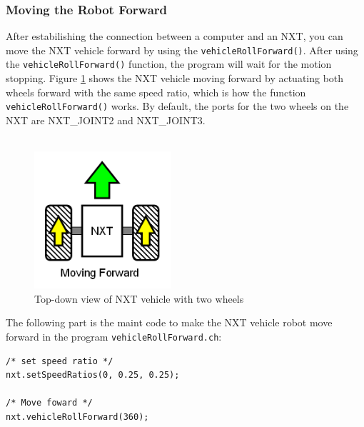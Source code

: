 \documentclass[11pt]{article}
\begin{document}
%

\subsubsection{Moving the Robot Forward}
After estabilishing the connection between a computer and an NXT, you can move the NXT 
vehicle forward by using the \verb+vehicleRollForward()+. After using the 
\verb+vehicleRollForward()+ function, the program will wait for the motion stopping. 
Figure \ref{fig_NXT_forward} shows the NXT vehicle moving forward by actuating both wheels 
forward with the same speed ratio, which is how the function \verb+vehicleRollForward()+ 
works. By default, the ports for the two wheels on the NXT are \textsc{NXT\_JOINT2} and 
\textsc{NXT\_JOINT3}.\\
\\
\begin{figure}[h]
  \begin{center}
    \includegraphics[height=2in]{figure/mindstorm/Vehicle_forward.png}
    \caption{Top-down view of NXT vehicle with two wheels\label{fig_NXT_forward}}
  \end{center}
\end{figure}

\noindent
The following part is the maint code to make the NXT vehicle robot move forward in the 
program \verb+vehicleRollForward.ch+:
\begin{verbatim}
/* set speed ratio */
nxt.setSpeedRatios(0, 0.25, 0.25);

/* Move foward */
nxt.vehicleRollForward(360);
\end{verbatim}
\end{document}
